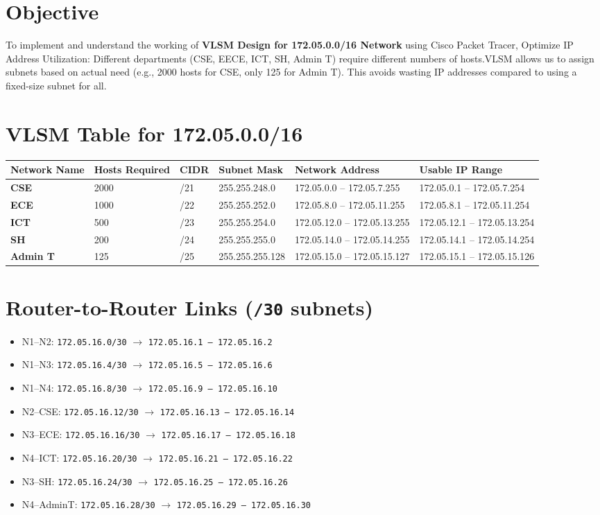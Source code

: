 \documentclass[12pt]{article}
\begin{document}
\section*{Objective}
To implement and understand the working of \textbf{VLSM Design for 172.05.0.0/16 Network} using Cisco Packet Tracer, Optimize IP Address Utilization: Different departments (CSE, EECE, ICT, SH, Admin T) require different numbers of hosts.VLSM allows us to assign subnets based on actual need (e.g., 2000 hosts for CSE, only 125 for Admin T). This avoids wasting IP addresses compared to using a fixed-size subnet for all.

\section*{VLSM Table for 172.05.0.0/16}

\begin{longtable}{|>{\bfseries}m{2.5cm}|m{1.8cm}|m{1cm}|m{3cm}|m{3cm}|m{3.5cm}|}
\hline
Network Name & Hosts Required & CIDR & Subnet Mask & Network Address & Usable IP Range \\
\hline
CSE & 2000 & /21 & 255.255.248.0 & 172.05.0.0 -- 172.05.7.255 & 172.05.0.1 -- 172.05.7.254 \\
ECE & 1000 & /22 & 255.255.252.0 & 172.05.8.0 -- 172.05.11.255 & 172.05.8.1 -- 172.05.11.254 \\
ICT & 500  & /23 & 255.255.254.0 & 172.05.12.0 -- 172.05.13.255 & 172.05.12.1 -- 172.05.13.254 \\
SH  & 200  & /24 & 255.255.255.0 & 172.05.14.0 -- 172.05.14.255 & 172.05.14.1 -- 172.05.14.254 \\
Admin T & 125 & /25 & 255.255.255.128 & 172.05.15.0 -- 172.05.15.127 & 172.05.15.1 -- 172.05.15.126 \\
\hline
\end{longtable}

\section*{Router-to-Router Links (\texttt{/30} subnets)}
\begin{itemize}
  \item N1--N2: \texttt{172.05.16.0/30} $\rightarrow$ \texttt{172.05.16.1 -- 172.05.16.2}
  \item N1--N3: \texttt{172.05.16.4/30} $\rightarrow$ \texttt{172.05.16.5 -- 172.05.16.6}
  \item N1--N4: \texttt{172.05.16.8/30} $\rightarrow$ \texttt{172.05.16.9 -- 172.05.16.10}
  \item N2--CSE: \texttt{172.05.16.12/30} $\rightarrow$ \texttt{172.05.16.13 -- 172.05.16.14}
  \item N3--ECE: \texttt{172.05.16.16/30} $\rightarrow$ \texttt{172.05.16.17 -- 172.05.16.18}
  \item N4--ICT: \texttt{172.05.16.20/30} $\rightarrow$ \texttt{172.05.16.21 -- 172.05.16.22}
  \item N3--SH: \texttt{172.05.16.24/30} $\rightarrow$ \texttt{172.05.16.25 -- 172.05.16.26}
  \item N4--AdminT: \texttt{172.05.16.28/30} $\rightarrow$ \texttt{172.05.16.29 -- 172.05.16.30}
\end{itemize}
\newpage
\end{document}
